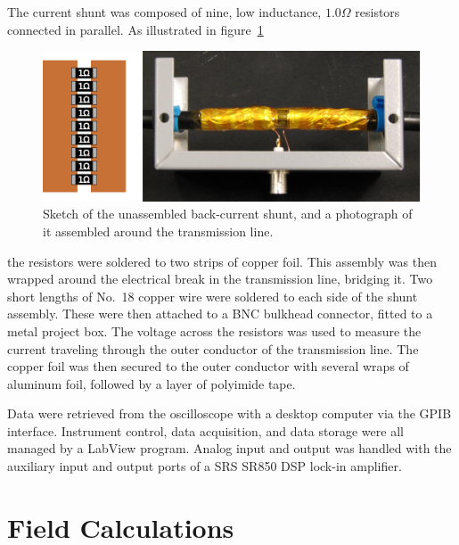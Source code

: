 The current shunt was composed of nine, low inductance, $1.0 \Omega$ resistors
connected in parallel. As illustrated in figure~\ref{fig:cbcs}
\begin{figure}
  \centering
  \includegraphics{./chapters/experiment/figures/cbcs.eps}
  \caption{Sketch of the unassembled back-current shunt, and a photograph of it
  assembled around the transmission line.}
  \label{fig:cbcs}
\end{figure}
the resistors were soldered to two strips of copper foil. This assembly was then
wrapped around the electrical break in the transmission line, bridging it. Two
short lengths of No.\ 18 copper wire were soldered to each side of the shunt
assembly. These were then attached to a BNC bulkhead connector, fitted to a
metal project box. The voltage across the resistors was used to measure the
current traveling through the outer conductor of the transmission line. The
copper foil was then secured to the outer conductor with several wraps of
aluminum foil, followed by a layer of polyimide tape.

Data were retrieved from the oscilloscope with a desktop computer via the GPIB
interface. Instrument control, data acquisition, and data storage were all
managed by a LabView program. Analog input and output was handled with the
auxiliary input and output ports of a SRS SR850 DSP lock-in amplifier.

\section{Field Calculations}

